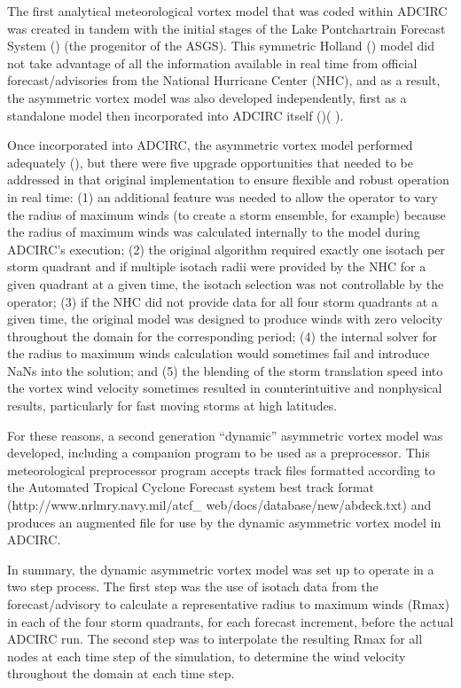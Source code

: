 \documentclass[jmse,article,submit,moreauthors,pdftex,12pt,a4paper]{mdpi}
\begin{document}
The first analytical meteorological vortex model that was coded 
within ADCIRC was created in tandem with the initial stages of the 
Lake Pontchartrain Forecast System (\cite{FlemingJG2008}) (the 
progenitor of the ASGS). This symmetric Holland (\cite 
{HollandGJ1980}) model did not take advantage of all the information 
available in real time from official forecast/advisories from the 
National Hurricane Center (NHC), and as a result, the asymmetric 
vortex model was also developed independently, first as a standalone 
model then incorporated into ADCIRC itself (\cite{MattocksC2006})(
\cite{MattocksC2008}). 

Once incorporated into ADCIRC, the asymmetric vortex model performed 
adequately (\cite{ForbesC2010}), but there were five upgrade 
opportunities that needed to be addressed in that original 
implementation to ensure flexible and robust operation in real time: 
(1) an additional feature was needed to allow the operator to vary 
the radius of maximum winds (to create a storm ensemble, for 
example) because the radius of maximum winds was calculated 
internally to the model during ADCIRC's execution; (2) the original 
algorithm required exactly one isotach per storm quadrant and if 
multiple isotach radii were provided by the NHC for a given quadrant 
at a given time, the isotach selection was not controllable by the 
operator; (3) if the NHC did not provide data for all four storm 
quadrants at a given time, the original model was designed to 
produce winds with zero velocity throughout the domain for the 
corresponding period; (4) the internal solver for the radius to 
maximum winds calculation would sometimes fail and introduce NaNs 
into the solution; and (5) the blending of the storm translation 
speed into the vortex wind velocity sometimes resulted in 
counterintuitive and nonphysical results, particularly for fast 
moving storms at high latitudes.

For these reasons, a second generation ``dynamic'' asymmetric vortex 
model was developed, including a companion program to be used as a 
preprocessor. This meteorological preprocessor program accepts track 
files formatted according to the Automated Tropical Cyclone Forecast 
system best track format (http://www.nrlmry.navy.mil/atcf\_ 
web/docs/database/new/abdeck.txt) and produces an augmented file for 
use by the dynamic asymmetric vortex model in ADCIRC. 

In summary, the dynamic asymmetric vortex model was set up to 
operate in a two step process. The first step was the use of isotach 
data from the forecast/advisory to calculate a representative radius 
to maximum winds (Rmax) in each of the four storm quadrants, for 
each forecast increment, before the actual ADCIRC run. The second 
step was to interpolate the resulting Rmax for all nodes at each 
time step of the simulation, to determine the wind velocity 
throughout the domain at each time step.
\end{document}
